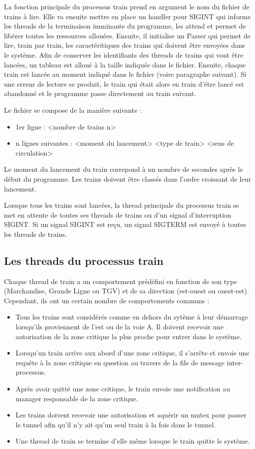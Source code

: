 \documentclass[a4paper,12pt]{article}
\begin{document}
La fonction principale du processus train prend en argument le nom du fichier de trains à lire. Elle va ensuite mettre en place un handler pour SIGINT qui informe les threads de la terminaison imminante du programme, les attend et permet de libérer toutes les ressources allouées. Ensuite, il initialise un Parser qui permet de lire, train par train, les caractéritiques des trains qui doivent être envoyées dans le système. Afin de conserver les identifiants des threads de trains qui vont être lancées, un tableau est alloué à la taille indiquée dans le fichier. Ensuite, chaque train est lancée au moment indiqué dans le fichier (voire paragraphe suivant). Si une erreur de lecture se produit, le train qui était alors en train d'être lancé est abandonné et le programme passe directement au train suivant.

Le fichier se compose de la manière suivante :

\begin{itemize}
	\item 1er ligne : <nombre de trains n>
	\item n lignes suivantes : <moment du lancement> <type de train> <sens de circulation>
\end{itemize}

Le moment du lancement du train correpond à un nombre de secondes après le début du programme. Les trains doivent être classés dans l'ordre croissant de leur lancement.

Lorsque tous les trains sont lancées, la thread principale du processus train se met en attente de toutes ses threads de trains ou d'un signal d'interruption SIGINT. Si un signal SIGINT est reçu, un signal SIGTERM est envoyé à toutes les threads de trains.

\subsection{Les threads du processus train}

Chaque thread de train a un comportement prédéfini en fonction de son type (Marchandise, Grande Ligne ou TGV) et de sa direction (est-ouest ou ouest-est). Cependant, ils ont un certain nombre de comportements communs :
\begin{itemize}
	\item Tous les trains sont considérés comme en dehors du sytème à leur démarrage lorsqu'ils proviennent de l'est ou de la voie A. Il doivent recevoir une autorisation de la zone critique la plus proche pour entrer dans le système.
	\item Lorsqu'un train arrive aux abord d'une zone critique, il s'arrête et envoie une requête à la zone critique en question au travers de la file de message inter-processus.
	\item Après avoir quitté une zone critique, le train envoie une notification au manager responsable de la zone critique.
	\item Les trains doivent recevoir une autorisation et aquérir un mutex pour passer le tunnel afin qu'il n'y ait qu'un seul train à la fois dans le tunnel.
	\item Une thread de train se termine d'elle même lorsque le train quitte le système.
\end{itemize}
\end{document}
